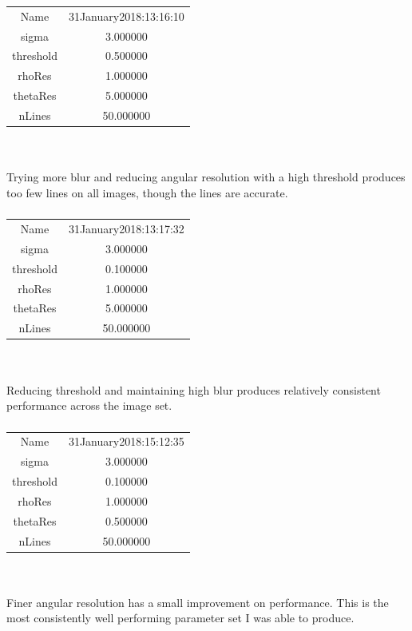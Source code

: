 \documentclass[12pt]{article}
\begin{document}
\subsubsection{}
\begin{tabular} { c c }
Name & 31January2018:13:16:10\\
sigma & 3.000000\\
threshold & 0.500000\\
rhoRes & 1.000000\\
thetaRes & 5.000000\\
nLines & 50.000000
\end{tabular}
\\ \\
Trying more blur and reducing angular resolution with a high threshold produces too few lines on all images, though the lines are accurate.

\subsubsection{}
\begin{tabular} { c c }
Name & 31January2018:13:17:32\\
sigma & 3.000000\\
threshold & 0.100000\\
rhoRes & 1.000000\\
thetaRes & 5.000000\\
nLines & 50.000000
\end{tabular}
\\ \\
Reducing threshold and maintaining high blur produces relatively consistent performance across the image set.

\subsubsection{}
\begin{tabular} { c c }
Name & 31January2018:15:12:35\\
sigma & 3.000000\\
threshold & 0.100000\\
rhoRes & 1.000000\\
thetaRes & 0.500000\\
nLines & 50.000000
\end{tabular}
\\ \\
Finer angular resolution has a small improvement on performance. This is the most consistently well performing parameter set I was able to produce.
\end{document}
